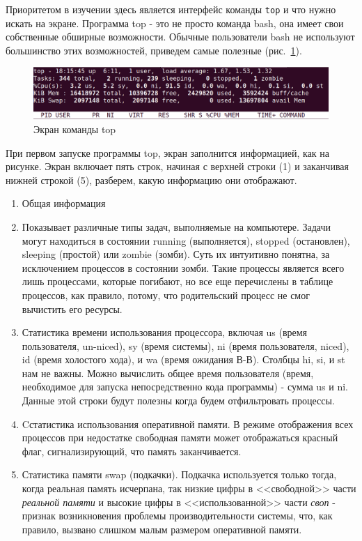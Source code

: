 \documentclass[12pt]{article}
\providecommand{\tightlist}{%
  \setlength{\itemsep}{0pt}\setlength{\parskip}{0pt}}
\begin{document}
Приоритетом в изучении здесь является интерфейс команды \texttt{top} и
что нужно искать на экране. Программа top - это не просто команда bash,
она имеет свои собственные обширные возможности. Обычные пользователи
bash не используют большинство этих возможностей, приведем самые
полезные (рис.~\ref{fig:topscreen}).

\begin{figure}[tbh]
  \centering
  \includegraphics[width=0.9\linewidth]{blog/2019/bash-essentials/top-header.png}

  \caption{Экран команды top}
  \label{fig:topscreen}
\end{figure}
При первом запуске программы top, экран заполнится информацией, как на
рисунке. Экран включает пять строк, начиная с верхней строки (1) и
заканчивая нижней строкой (5), разберем, какую информацию они
отображают.

\begin{enumerate}
\tightlist
\item
  Общая информация
\item
  Показывает различные типы задач, выполняемые на компьютере. Задачи
  могут находиться в состоянии running (выполняется), stopped
  (остановлен), sleeping (простой) или zombie (зомби). Суть их
  интуитивно понятна, за исключением процессов в состоянии зомби. Такие
  процессы является всего лишь процессами, которые погибают, но все еще
  перечислены в таблице процессов, как правило, потому, что родительский
  процесс не смог вычистить его ресурсы.
\item
  Статистика времени использования процессора, включая us (время
  пользователя, un-niced), sy (время системы), ni (время пользователя,
  niced), id (время холостого хода), и wa (время ожидания В-В). Столбцы
  hi, si, и st нам не важны. Можно вычислить общее время пользователя
  (время, необходимое для запуска непосредственно кода программы) -
  сумма us и ni. Данные этой строки будут полезны когда будем
  отфильтровать процессы.
\item
  Cстатистика использования оперативной памяти. В режиме отображения всех
  процессов при недостатке свободная памяти может отображаться красный
  флаг, сигнализирующий, что память заканчивается.
\item
  Статистика памяти swap (подкачки). Подкачка используется только тогда,
  когда реальная память исчерпана, так низкие цифры в <<свободной>> части
  \emph{реальной памяти} и высокие цифры в <<использованной>> части
  \emph{своп} - признак возникновения проблемы производительности
  системы, что, как правило, вызвано слишком малым размером оперативной
  памяти.
\end{enumerate}
\end{document}
